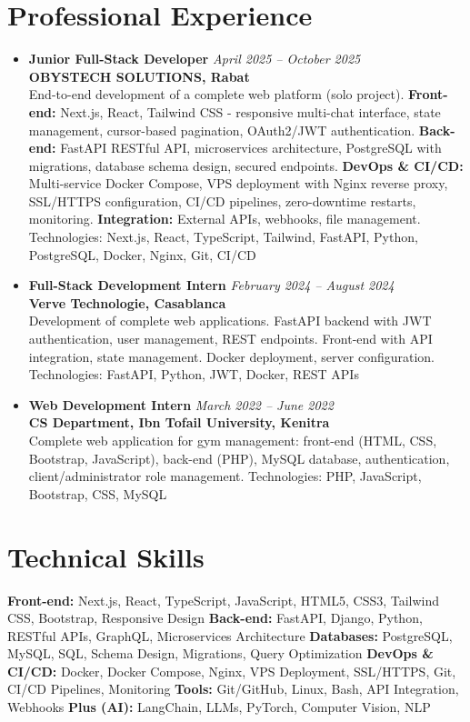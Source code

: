 \documentclass[10pt,a4paper]{article}
\newcommand{\cvitem}[2]{\textbf{#1} \hfill \textit{#2}}
\begin{document}
\section*{Professional Experience}
\begin{itemize}
    \item \cvitem{Junior Full-Stack Developer}{April 2025 -- October 2025}\\
    \textbf{OBYSTECH SOLUTIONS, Rabat}\\
    End-to-end development of a complete web platform (solo project). \textbf{Front-end:} Next.js, React, Tailwind CSS - responsive multi-chat interface, state management, cursor-based pagination, OAuth2/JWT authentication. \textbf{Back-end:} FastAPI RESTful API, microservices architecture, PostgreSQL with migrations, database schema design, secured endpoints. \textbf{DevOps \& CI/CD:} Multi-service Docker Compose, VPS deployment with Nginx reverse proxy, SSL/HTTPS configuration, CI/CD pipelines, zero-downtime restarts, monitoring. \textbf{Integration:} External APIs, webhooks, file management. Technologies: Next.js, React, TypeScript, Tailwind, FastAPI, Python, PostgreSQL, Docker, Nginx, Git, CI/CD
    \item \cvitem{Full-Stack Development Intern}{February 2024 -- August 2024}\\
    \textbf{Verve Technologie, Casablanca}\\
    Development of complete web applications. FastAPI backend with JWT authentication, user management, REST endpoints. Front-end with API integration, state management. Docker deployment, server configuration. Technologies: FastAPI, Python, JWT, Docker, REST APIs
    \item \cvitem{Web Development Intern}{March 2022 -- June 2022}\\
    \textbf{CS Department, Ibn Tofail University, Kenitra}\\
    Complete web application for gym management: front-end (HTML, CSS, Bootstrap, JavaScript), back-end (PHP), MySQL database, authentication, client/administrator role management. Technologies: PHP, JavaScript, Bootstrap, CSS, MySQL
\end{itemize}

\section*{Technical Skills}
\textbf{Front-end:} Next.js, React, TypeScript, JavaScript, HTML5, CSS3, Tailwind CSS, Bootstrap, Responsive Design \quad
\textbf{Back-end:} FastAPI, Django, Python, RESTful APIs, GraphQL, Microservices Architecture \quad
\textbf{Databases:} PostgreSQL, MySQL, SQL, Schema Design, Migrations, Query Optimization \quad
\textbf{DevOps \& CI/CD:} Docker, Docker Compose, Nginx, VPS Deployment, SSL/HTTPS, Git, CI/CD Pipelines, Monitoring \quad
\textbf{Tools:} Git/GitHub, Linux, Bash, API Integration, Webhooks \quad
\textbf{Plus (AI):} LangChain, LLMs, PyTorch, Computer Vision, NLP
\end{document}

